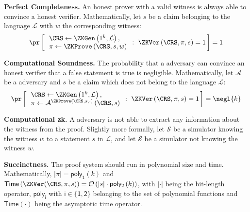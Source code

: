 \begin{description}
\item \textbf{Perfect Completeness.} An honest prover with a valid
  witness is always able to convince a honest verifier.
  Mathematically, let $s$ be a claim belonging to the language
  $\mathcal{L}$ with $w$ the corresponding witness:
  \begin{equation*}
    \pr\left[\, \begin{array}{l}
        \CRS \leftarrow \ZKGen \left(1^k, \mathcal{L} \right),\\
        \pi \leftarrow \ZKProve \left(\CRS, s, w \right)
      \end{array} : ~ \ZKVer \left( \CRS, \pi, s \right) = 1  \,\right] = 1
  \end{equation*}
\item \textbf{Computational Soundness.} The probability that a \ppt
  adversary can convince an honest verifier that a false statement is
  true is negligible. Mathematically, let $\mathcal{A}$ be a \ppt
  adversary and $s$ be a claim which does not belong to the language
  $\mathcal{L}$:
  \begin{equation*}
    \pr\left[\, \begin{array}{l}
        \CRS \leftarrow \ZKGen \left(1^k, \mathcal{L} \right), \\
        \pi \leftarrow \mathcal{A}^{\ZKProve \left(\CRS, s, \cdot \right)} \left(\CRS, s \right)
      \end{array} : ~ \ZKVer \left( \CRS, \pi, s \right) = 1  \,\right] = \negl{k}
  \end{equation*}
\item \textbf{Computational \acrlong{zk}.} A \ppt adversary is not
  able to extract any information about the witness from the proof.
  Slightly more formally, let $\mathcal{S}$ be a simulator knowing the
  witness $w$ to a statement $s$ in $\mathcal{L}$, and let
  $\overline{\mathcal{S}}$ be a simulator not knowing the witness $w$. 
  
\item \textbf{Succinctness.} The proof system should run in polynomial
  size and time. Mathematically, $| \pi | =
  \mathsf{poly_1}\left(k\right)$ and $\mathsf{Time}\left(\ZKVer(\CRS,
    \pi, s\right)) =
  \mathcal{O}\left(|s|\cdot\mathsf{poly_2}\left(k\right)\right)$, with
  $|\cdot|$ being the bit-length operator, $\mathsf{poly_i}$ with
  $\mathsf{i} \in \{\mathsf{1},\mathsf{2}\}$ belonging to the set of
  polynomial functions and $\mathsf{Time}(\cdot)$ being the asymptotic
  time operator.
\end{description}
